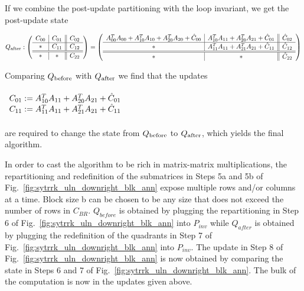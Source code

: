 If we combine the post-update partitioning with the loop invariant, we get the post-update state

$  \\
Q_{\rm after}:
\left( \begin{array}{c | c || c}  C_{00}  &  C_{01}  &  C_{02}  \\ \hline  *  &  C_{11}  &  C_{12}  \\ \hline \hline  *  &  *  &  C_{22}  \end{array} \right)
=
\left( \begin{array}{c | c || c}  A_{00}^T A_{00} + A_{10}^T A_{10} + A_{20}^T A_{20} + \hat{C}_{00}  &  A_{10}^T A_{11} + A_{20}^T A_{21} + \hat{C}_{01}  &  \hat{C}_{02}  \\ \hline  *  &  A_{11}^T A_{11} + A_{21}^T A_{21} + \hat{C}_{11}  &  \hat{C}_{12}  \\ \hline \hline  *  &  *  &  \hat{C}_{22}  \end{array} \right)
$

Comparing $\QBefore$ with $\QAfter$ we find that the updates
\\
\\
$\begin{array}{l}

C_{01} \becomes A_{10}^T A_{11} + A_{20}^T A_{21} + \hat{C}_{01} \\
C_{11} \becomes A_{11}^T A_{11} + A_{21}^T A_{21} + \hat{C}_{11}

\end{array} $
\\
\\
are required to change the state from $\QBefore$ to $\QAfter$, which yields the final algorithm.

In order to cast the algorithm to be rich in matrix-matrix multiplications, the repartitioning and
redefinition of the submatrices in Steps 5a and 5b of Fig.~\ref{fig:sytrrk_uln_downright_blk_ann}
expose multiple rows and/or columns at a time. Block size b can be chosen to be any size that
does not exceed the number of rows in $C_{BR}$. $Q_{before}$ is obtained by plugging the repartitioning
in Step 6 of Fig.~\ref{fig:sytrrk_uln_downright_blk_ann} into $P_{inv}$ while $Q_{after}$ is
obtained by plugging the redefinition of the quadrants in Step 7 of Fig.~\ref{fig:sytrrk_uln_downright_blk_ann}
into $P_{inv}$. The update in Step 8 of Fig.~\ref{fig:sytrrk_uln_downright_blk_ann}
is now obtained by comparing the state in Steps 6 and 7 of Fig.~\ref{fig:sytrrk_uln_downright_blk_ann}.
The bulk of the computation is now in the updates given above.



